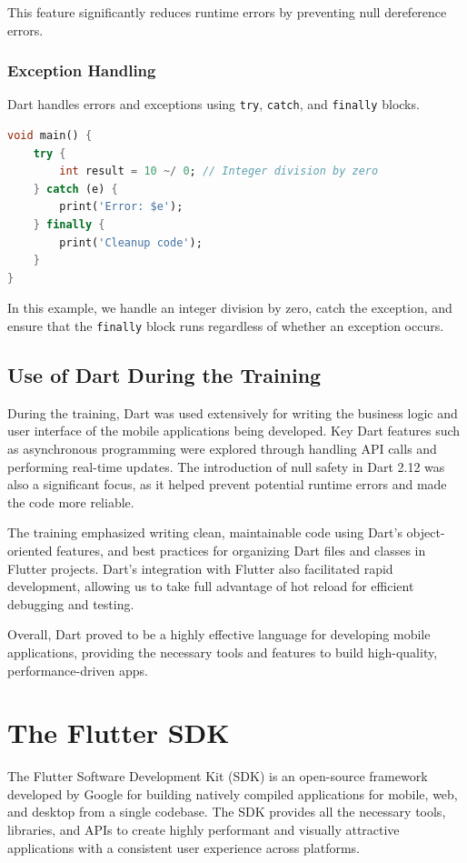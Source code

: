 \documentclass[12pt,a4paper]{report}
\begin{document}
This feature significantly reduces runtime errors by preventing null dereference errors.

\subsubsection{Exception Handling}
Dart handles errors and exceptions using \texttt{try}, \texttt{catch}, and \texttt{finally} blocks.

\begin{lstlisting}[language=Dart, caption={Exception Handling in Dart}]
void main() {
    try {
        int result = 10 ~/ 0; // Integer division by zero
    } catch (e) {
        print('Error: $e');
    } finally {
        print('Cleanup code');
    }
}
\end{lstlisting}

In this example, we handle an integer division by zero, catch the exception, and ensure that the \texttt{finally} block runs regardless of whether an exception occurs.


\subsection{Use of Dart During the Training}
During the training, Dart was used extensively for writing the business logic and user interface of the mobile applications being developed. Key Dart features such as asynchronous programming were explored through handling API calls and performing real-time updates. The introduction of null safety in Dart 2.12 was also a significant focus, as it helped prevent potential runtime errors and made the code more reliable.

The training emphasized writing clean, maintainable code using Dart’s object-oriented features, and best practices for organizing Dart files and classes in Flutter projects. Dart's integration with Flutter also facilitated rapid development, allowing us to take full advantage of hot reload for efficient debugging and testing.

Overall, Dart proved to be a highly effective language for developing mobile applications, providing the necessary tools and features to build high-quality, performance-driven apps.

\section{The Flutter SDK}
The Flutter Software Development Kit (SDK) is an open-source framework developed by Google for building natively compiled applications for mobile, web, and desktop from a single codebase. The SDK provides all the necessary tools, libraries, and APIs to create highly performant and visually attractive applications with a consistent user experience across platforms.
\end{document}
